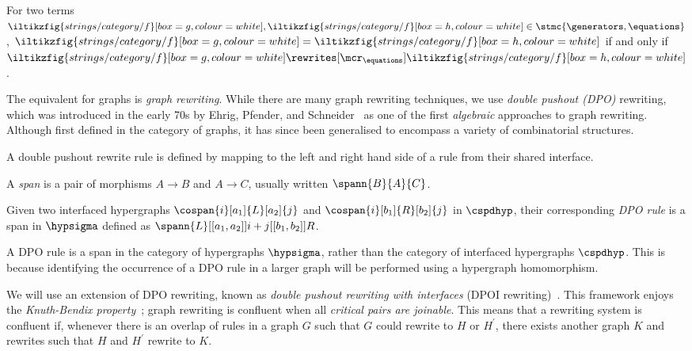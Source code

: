 \begin{proposition}
    For two terms \(
    \iltikzfig{strings/category/f}[box=g,colour=white],
    \iltikzfig{strings/category/f}[box=h,colour=white]
    \in \stmc{\generators,\equations}
    \), \(
    \iltikzfig{strings/category/f}[box=g,colour=white]
    =
    \iltikzfig{strings/category/f}[box=h,colour=white]
    \) if and only if \(
    \iltikzfig{strings/category/f}[box=g,colour=white]
    \rewrites[\mcr_{\equations}]
    \iltikzfig{strings/category/f}[box=h,colour=white]
    \).
\end{proposition}

The equivalent for graphs is \emph{graph rewriting}.
While there are many graph rewriting techniques, we use
\emph{double pushout (DPO)} rewriting, which was introduced in the early 70s by
Ehrig, Pfender, and Schneider~\cite{ehrig1973graphgrammars} as one of the first
\emph{algebraic} approaches to graph rewriting.
Although first defined in the category of graphs, it has since been generalised
to encompass a variety of combinatorial structures.

A double pushout rewrite rule is defined by mapping to the left and right hand
side of a rule from their shared interface.

\begin{definition}
    A \emph{span} is a pair of morphisms \(A \to B\) and \(A \to C\), usually
    written \(\spann{B}{A}{C}\).
\end{definition}

\begin{definition}\label{def:dpo-rule}
    Given two interfaced hypergraphs \(
    \cospan{i}[a_1]{L}[a_2]{j}
    \) and \(
    \cospan{i}[b_1]{R}[b_2]{j}
    \) in \(\cspdhyp\), their corresponding \emph{DPO rule} is a span in \(\hypsigma\)
    defined as \(
    \spann{L}[[a_1,a_2]]{i + j}[[b_1,b_2]]{R}
    \).
\end{definition}

A DPO rule is a span in the category of hypergraphs \(\hypsigma\),
rather than the category of interfaced hypergraphs \(\cspdhyp\).
This is because identifying the occurrence of a DPO rule in a larger graph will
be performed using a hypergraph homomorphism.

We will use an extension of DPO rewriting, known as
\emph{double pushout rewriting with interfaces}
(DPOI rewriting)~\cite{bonchi2017confluence}.
This framework enjoys the \emph{Knuth-Bendix property}~\cite{knuth1970simple};
graph rewriting is confluent when all \emph{critical pairs are joinable}.
This means that a rewriting system is confluent if, whenever
there is an overlap of rules in a graph \(G\) such that \(G\) could rewrite to
\(H\) or \(H^\prime\), there exists another graph \(K\) and rewrites
such that \(H\) and \(H^\prime\) rewrite to \(K\).

